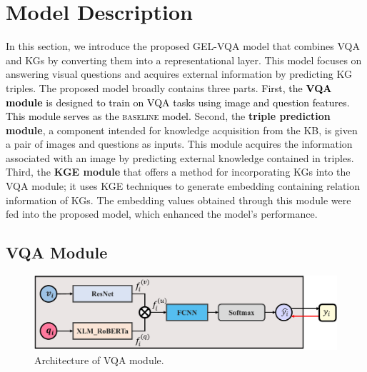 \documentclass[letterpaper]{article} %
\newcommand{\kt}[1]{\textcolor{black}{#1}}
\begin{document}
\section{Model Description}\label{sec:model-description}
In this section, we introduce the proposed \textsc{GEL-VQA} model that combines VQA and KGs by converting them into a representational layer. This model focuses on answering visual questions and acquires external information by predicting KG triples. The proposed model broadly contains three parts.
\kt{First, the \textbf{VQA module} is designed to train on VQA tasks using image and question features. This module serves as the \textsc{baseline} model.} Second, the \textbf{triple prediction module}, a component intended for knowledge acquisition from the KB, is given a pair of images and questions as inputs. This module acquires the information associated with an image by predicting external knowledge contained in triples. Third, the \textbf{KGE module} that offers a method for incorporating KGs into the VQA module; it uses KGE techniques to generate embedding containing relation information of KGs. The embedding values obtained through this module were fed into the proposed model, which enhanced the model's performance.

\subsection{VQA Module}\label{subsec:VQAModule}
\begin{figure}[H]
\includegraphics[width=\linewidth]{model_images/VQA_Module.pdf}
\caption{Architecture of VQA module.}
\label{fig:VQA}
\end{figure}
\end{document}

